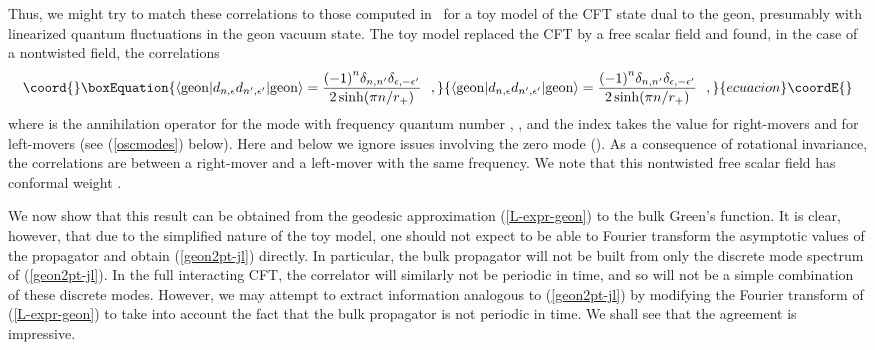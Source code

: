 \documentclass[a4paper,12pt]{article}
\begin{document}
Thus, we might try to match these correlations to those computed
in~\cite{louko:geon} for a toy model of the CFT state \coordHE{} dual to the \coordHE{} geon,
presumably with linearized quantum fluctuations in the geon vacuum
state.  The toy model replaced the CFT by a 
free scalar
field and found, in the case of a nontwisted field, the
correlations
%
\begin{equation}\coord{}\boxEquation{ 
\label{geon2pt-jl}
\langle {\rm geon}| 
d_{n,\epsilon} d_{n',\epsilon'} 
|{\rm geon} \rangle =
\frac{
{(-1)}^n \delta_{n,n'} \delta_{\epsilon,-\epsilon'}}
 {2\sinh(\pi n/r_+)}
\ \ , 
}{ 
\langle {\rm geon}| 
d_{n,\epsilon} d_{n',\epsilon'} 
|{\rm geon} \rangle =
\frac{
{(-1)}^n \delta_{n,n'} \delta_{\epsilon,-\epsilon'}}
 {2\sinh(\pi n/r_+)}
\ \ , 
}{ecuacion}\coordE{}\end{equation}
where \coordHE{} is the annihilation operator for the
mode with frequency quantum number \coordHE{}, \coordHE{}, and the
index \myHighlight{$\epsilon$}\coordHE{} takes the value \coordHE{} for right-movers and \coordHE{} for
left-movers
(see (\ref{oscmodes}) below). 
Here and below we ignore issues involving the zero mode (\coordHE{}).
As a consequence of rotational invariance, the
correlations are between a right-mover and a left-mover with the same
frequency.  We note that this nontwisted free scalar field has
conformal weight \coordHE{}.

We now show that this result can be obtained from the geodesic
approximation (\ref{L-expr-geon}) to the bulk Green's function.  It is
clear, however, that due to the simplified nature of the toy model,
one should not expect to be able to Fourier transform the asymptotic
values of the propagator and obtain (\ref{geon2pt-jl}) directly.  In
particular, the bulk propagator will not be built from only the
discrete mode spectrum of (\ref{geon2pt-jl}).  In the full interacting
CFT, the correlator will similarly not be periodic in time, and
so will not be a simple combination of these
discrete modes.  However, we may attempt to extract information
analogous to (\ref{geon2pt-jl}) by modifying the Fourier transform of
(\ref{L-expr-geon}) to take into account the fact that the bulk
propagator is not periodic in time.  We shall see that the agreement
is impressive.
\end{document}
